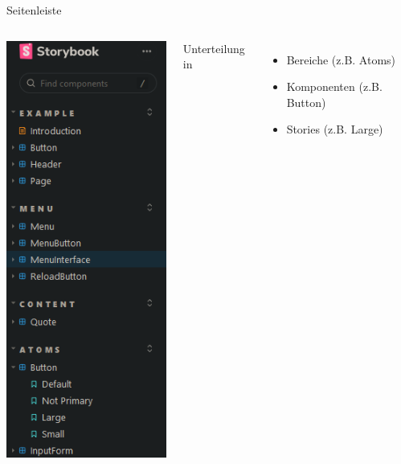 \documentclass{beamer}
\begin{document}
\begin{frame}{Seitenleiste}
	\begin{columns}
		\includegraphics[height=.8\textheight]{Images/web-ui/sidebar.png}
		
		Unterteilung in
		\begin{itemize}
			\item Bereiche (z.B. Atoms)
			\item Komponenten (z.B. Button)
			\item Stories (z.B. Large)
		\end{itemize}
	\end{columns}
\end{frame}
\end{document}
